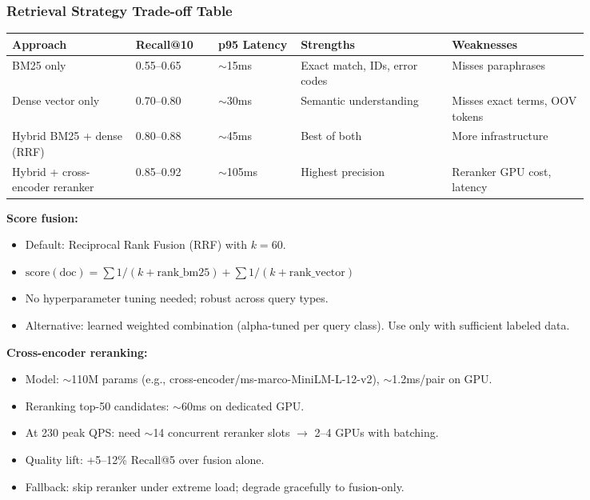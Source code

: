 \subsubsection*{Retrieval Strategy Trade-off Table}

\small
\begin{tabular}{|p{0.18\linewidth}|p{0.12\linewidth}|p{0.12\linewidth}|p{0.22\linewidth}|p{0.20\linewidth}|}
\hline
\textbf{Approach} & \textbf{Recall@10} & \textbf{p95 Latency} & \textbf{Strengths} & \textbf{Weaknesses} \\
\hline
BM25 only & 0.55--0.65 & $\sim$15ms & Exact match, IDs, error codes & Misses paraphrases \\
\hline
Dense vector only & 0.70--0.80 & $\sim$30ms & Semantic understanding & Misses exact terms, OOV tokens \\
\hline
Hybrid BM25 + dense (RRF) & 0.80--0.88 & $\sim$45ms & Best of both & More infrastructure \\
\hline
Hybrid + cross-encoder reranker & 0.85--0.92 & $\sim$105ms & Highest precision & Reranker GPU cost, latency \\
\hline
\end{tabular}
\normalsize

\textbf{Score fusion:}

\begin{itemize}
  \item Default: Reciprocal Rank Fusion (RRF) with $k=60$.
  \item $\text{score}(\text{doc}) = \sum 1/(k + \text{rank\_bm25}) + \sum 1/(k + \text{rank\_vector})$
  \item No hyperparameter tuning needed; robust across query types.
  \item Alternative: learned weighted combination (alpha-tuned per query class). Use only with sufficient labeled data.
\end{itemize}

\textbf{Cross-encoder reranking:}

\begin{itemize}
  \item Model: $\sim$110M params (e.g., cross-encoder/ms-marco-MiniLM-L-12-v2), $\sim$1.2ms/pair on GPU.
  \item Reranking top-50 candidates: $\sim$60ms on dedicated GPU.
  \item At 230 peak QPS: need $\sim$14 concurrent reranker slots $\rightarrow$ 2--4 GPUs with batching.
  \item Quality lift: +5--12\% Recall@5 over fusion alone.
  \item Fallback: skip reranker under extreme load; degrade gracefully to fusion-only.
\end{itemize}

